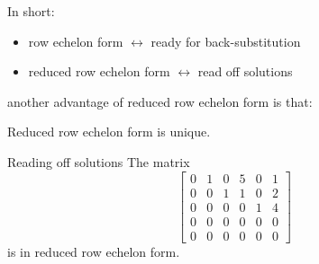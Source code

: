 \documentclass{beamer}
\begin{document}
\begin{frame}
  In short:
  \begin{itemize}
  \item row echelon form $\leftrightarrow$ ready for back-substitution
  \item reduced row echelon form $\leftrightarrow$ read off solutions
  \end{itemize}\vfill
  another advantage of reduced row echelon form is that:\vfill
  \begin{theorem}
    Reduced row echelon form is unique.
  \end{theorem}
\end{frame}

\begin{frame}{Reading off solutions}
  The matrix
    \begin{equation*}
      \left[\begin{array}{rrrrrrrr}
              0 & 1 & 0 & 5 & 0 & 1  \\
              0 & 0 & 1 & 1 & 0 & 2  \\
              0 & 0 & 0 & 0 & 1 & 4  \\
              0 & 0 & 0 & 0 & 0 & 0 \\
              0 & 0 & 0 & 0 & 0 & 0 
            \end{array}\right] 
        \end{equation*}
        is in reduced row echelon form.
\end{frame}
\end{document}
